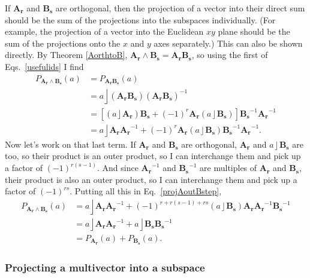 \documentclass{utarticle}
\newcommand{\bl}[1]{\ensuremath{\bm{#1}}}
\DeclareMathOperator{\lin}{\rfloor}
\DeclareMathOperator{\out}{\wedge}
\begin{document}
If \bl{A_r} and \bl{B_s} are orthogonal, then the projection of a vector into
their direct sum should be the sum of the projections into the subspaces individually.  
(For example, the projection of a vector into the Euclidean $xy$ plane should be the 
sum of the projections onto the $x$ and $y$ axes separately.)  This can also be shown
directly.  By Theorem \ref{AorthtoB}, $\bl{A_r} \out \bl{B_s} = \bl{A_r}\bl{B_s}$, so using 
the first of Eqs.~\eqref{usefulids} I find
\begin{align}
P_{\bl{A_r} \out \bl{B_s}}(a) & = P_{\bl{A_r}\bl{B_s}}(a) \nonumber \\
                                                  & = a \lin (\bl{A_r}\bl{B_s}) (\bl{A_r}\bl{B_s})^{-1} \nonumber \\ 
                                                  & = [(a \lin \bl{A_r}) \bl{B_s} + (-1)^r \bl{A_r} (a \lin \bl{B_s})] \bl{B_s}^{-1} \bl{A_r}^{-1} \nonumber \\
                                                  & =  a \lin \bl{A_r} \bl{A_r}^{-1} + (-1)^r \bl{A_r} (a \lin \bl{B_s}) \bl{B_s}^{-1} \bl{A_r}^{-1}.
\label{projAoutBstep}
\end{align}
Now let's work on that last term.  If \bl{A_r} and \bl{B_s} are orthogonal, \bl{A_r} and 
$a \lin \bl{B_s}$ are too, so their product is an outer product, so I can interchange them 
and pick up a factor of $(-1)^{r(s-1)}$.  And since $\bl{A_r}^{-1}$ and $\bl{B_s}^{-1}$ 
are multiples of \bl{A_r} and \bl{B_s}, their product is also an outer product, so 
I can interchange them and pick up a factor of $(-1)^{rs}$.  Putting all this in 
Eq.~\eqref{projAoutBstep},
\begin{align}
P_{\bl{A_r} \out \bl{B_s}}(a) & = a \lin \bl{A_r} \bl{A_r}^{-1} + (-1)^{r + r(s-1) + rs} (a \lin \bl{B_s}) \bl{A_r} \bl{A_r}^{-1} \bl{B_s}^{-1} \nonumber \\
                                                  & = a \lin \bl{A_r} \bl{A_r}^{-1} + a \lin \bl{B_s} \bl{B_s}^{-1} \nonumber \\
                                                  & = P_{\bl{A_r}}(a) + P_{\bl{B_s}}(a).
\end{align}

\subsubsection{Projecting a multivector into a subspace}
\end{document}
